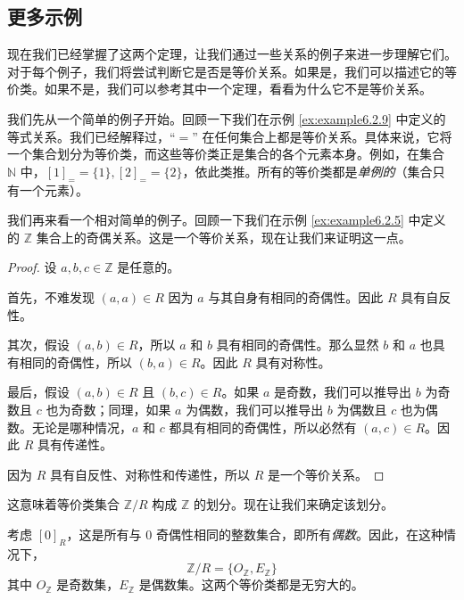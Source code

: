 
\subsection{更多示例}

现在我们已经掌握了这两个定理，让我们通过一些关系的例子来进一步理解它们。对于每个例子，我们将尝试判断它是否是等价关系。如果是，我们可以描述它的等价类。如果不是，我们可以参考其中一个定理，看看为什么它不是等价关系。\\

\begin{example}
    我们先从一个简单的例子开始。回顾一下我们在示例 \ref{ex:example6.2.9} 中定义的等式关系。我们已经解释过，``$=$'' 在任何集合上都是等价关系。具体来说，它将一个集合划分为等价类，而这些等价类正是集合的各个元素本身。例如，在集合 $\mathbb{N}$ 中，$[1]_{=} = \{1\}, [2]_{=} = \{2\}$，依此类推。所有的等价类都是\emph{单例的}（集合只有一个元素）。
\end{example}

\begin{example}
    我们再来看一个相对简单的例子。回顾一下我们在示例 \ref{ex:example6.2.5} 中定义的 $\mathbb{Z}$ 集合上的奇偶关系。这是一个等价关系，现在让我们来证明这一点。
    \begin{proof}
        设 $a, b, c \in \mathbb{Z}$ 是任意的。

        首先，不难发现 $(a,a) \in R$ 因为 $a$ 与其自身有相同的奇偶性。因此 $R$ 具有自反性。

        其次，假设 $(a,b) \in R$，所以 $a$ 和 $b$ 具有相同的奇偶性。那么显然 $b$ 和 $a$ 也具有相同的奇偶性，所以 $(b,a) \in R$。因此 $R$ 具有对称性。

        最后，假设 $(a,b) \in R$ 且 $(b,c) \in R$。如果 $a$ 是奇数，我们可以推导出 $b$ 为奇数且 $c$ 也为奇数；同理，如果 $a$ 为偶数，我们可以推导出 $b$ 为偶数且 $c$ 也为偶数。无论是哪种情况，$a$ 和 $c$ 都具有相同的奇偶性，所以必然有 $(a,c) \in R$。因此 $R$ 具有传递性。

        因为 $R$ 具有自反性、对称性和传递性，所以 $R$ 是一个等价关系。
    \end{proof}

    这意味着等价类集合 $\mathbb{Z}/R$ 构成 $\mathbb{Z}$ 的划分。现在让我们来确定该划分。

    考虑 $[0]_R$，这是所有与 $0$ 奇偶性相同的整数集合，即所有\emph{偶数}。因此，在这种情况下，
    \[\mathbb{Z}/R = \{O_{\mathbb{Z}}, E_{\mathbb{Z}}\}\]
    其中 $O_{\mathbb{Z}}$ 是奇数集，$E_{\mathbb{Z}}$ 是偶数集。这两个等价类都是无穷大的。
\end{example}

